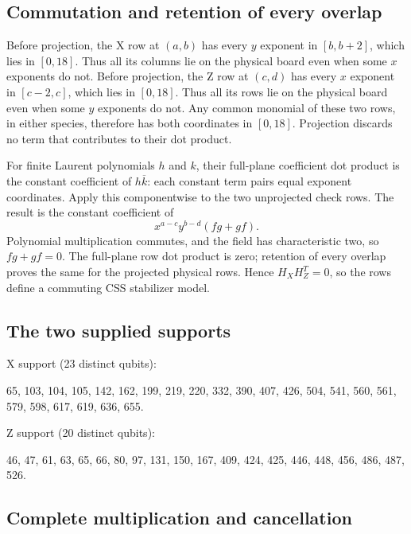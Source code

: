 \documentclass{article}
\begin{document}
\subsection{Commutation and retention of every overlap}\label{sec:witness-commutation}

Before projection, the X row at \((a,b)\) has every \(y\) exponent in \([b,b+2]\), which lies in
\([0,18]\). Thus all its columns lie on the physical board even when some \(x\) exponents do not.
Before projection, the Z row at \((c,d)\) has every \(x\) exponent in \([c-2,c]\), which lies in
\([0,18]\). Thus all its rows lie on the physical board even when some \(y\) exponents do not.
Any common monomial of these two rows, in either species, therefore has both coordinates in
\([0,18]\). Projection discards no term that contributes to their dot product.

For finite Laurent polynomials \(h\) and \(k\), their full-plane coefficient dot product is the
constant coefficient of \(h\overline{k}\): each constant term pairs equal exponent coordinates.
Apply this componentwise to the two unprojected check rows. The result is the constant
coefficient of
\begin{equation}
  x^{a-c} y^{b-d} (fg + gf).
\end{equation}
Polynomial multiplication commutes, and the field has characteristic two, so \(fg + gf = 0\).
The full-plane row dot product is zero; retention of every overlap proves the same for the
projected physical rows. Hence \(H_X H_Z^T = 0\), so the rows define a commuting CSS stabilizer
model.

\subsection{The two supplied supports}\label{sec:witness-supports}

X support (23 distinct qubits):

65, 103, 104, 105, 142, 162, 199, 219, 220, 332, 390, 407, 426, 504, 541, 560, 561, 579, 598,
617, 619, 636, 655.

Z support (20 distinct qubits):

46, 47, 61, 63, 65, 66, 80, 97, 131, 150, 167, 409, 424, 425, 446, 448, 456, 486, 487, 526.

\subsection{Complete multiplication and cancellation}\label{sec:witness-multiplication}
\end{document}
